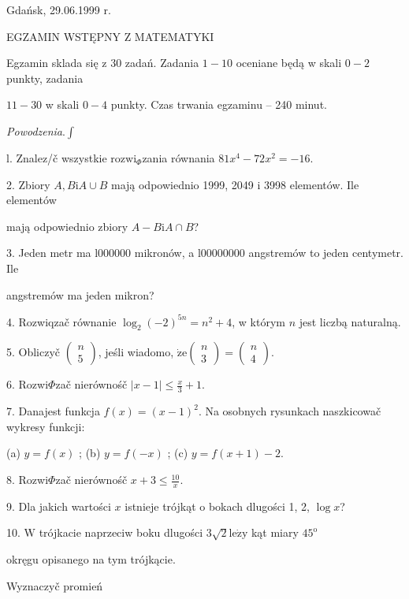 \documentclass[a4paper,12pt]{article}
\begin{document}
Gdańsk, 29.06.1999 r.

EGZAMIN WSTĘPNY Z MATEMATYKI

Egzamin sklada się z 30 zadań. Zadania $1-10$ oceniane będą w skali $0-2$ punkty, zadania

$11-30$ w skali $0-4$ punkty. Czas trwania egzaminu -- 240 minut.

{\it Powodzenia}.$\displaystyle \int$

l. Znalez/č wszystkie $\mathrm{r}\mathrm{o}\mathrm{z}\mathrm{w}\mathrm{i}_{\Phi}$zania równania $81x^{4}-72x^{2}=-16.$

2. Zbiory $A, B\mathrm{i}A\cup B$ mają odpowiednio 1999, 2049 $\mathrm{i}$ 3998 elementów. Ile elementów

mają odpowiednio zbiory $A-B\mathrm{i}A\cap B$?

3. Jeden metr ma l000000 mikronów, a l00000000 angstremów to jeden centymetr. Ile

angstremów ma jeden mikron?

4. Rozwiqzač równanie $\log_{2}(-2)^{5n}=n^{2}+4$, w którym $n$ jest liczbą naturalną.

5. Obliczyč $\left(\begin{array}{l}
n\\
5
\end{array}\right)$, jeśli wiadomo, $\dot{\mathrm{z}}\mathrm{e} \left(\begin{array}{l}
n\\
3
\end{array}\right) =\left(\begin{array}{l}
n\\
4
\end{array}\right)$.

6. Rozwi$\Phi$zač nierównośč $|x-1|\displaystyle \leq\frac{x}{3}+1.$

7. Danajest funkcja $f(x)=(x-1)^{2}$. Na osobnych rysunkach naszkicowač wykresy funkcji:

(a) $y=f(x)$ ; (b) $y=f(-x)$ ; (c) $y=f(x+1)-2.$

8. Rozwi$\Phi$zač nierównośč $x+3\displaystyle \leq\frac{10}{x}.$

9. Dla jakich wartości $x$ istnieje trójkąt o bokach dlugości 1, 2, $\log x$?

10. $\mathrm{W}$ trójkacie naprzeciw boku dlugości $3\sqrt{2}\mathrm{l}\mathrm{e}\dot{\mathrm{z}}\mathrm{y}$ kąt miary $45^{\mathrm{o}}$

okręgu opisanego na tym trójkącie.

Wyznaczyč promień
\end{document}

